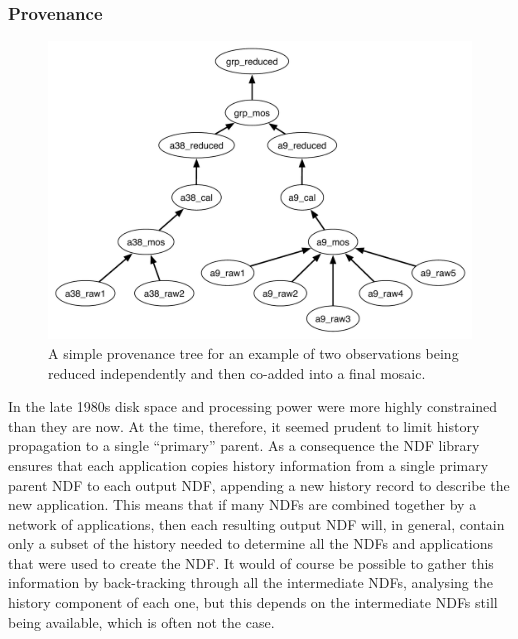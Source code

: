 \documentclass[final,authoryear,5p,times,twocolumn]{elsarticle}
\begin{document}
\subsubsection{Provenance}
\label{sec:provenance}

\begin{figure}
\includegraphics[width=\columnwidth]{provenance}
\caption{A simple provenance tree for an example of two observations
  being reduced independently and then co-added into a final
  mosaic.}
\label{fig:prov}
\end{figure}

In the late 1980s disk space and processing power were more highly
constrained than they are now. At the time, therefore, it
seemed prudent to limit history propagation to a single ``primary''
parent.  As a consequence the NDF library ensures that each application
copies history information from a single primary parent NDF to each
output NDF, appending a new history record to describe the new
application. This means that if many NDFs are combined together by a
network of applications, then each resulting output NDF will, in
general, contain only a subset of the history needed to determine all
the NDFs and applications that were used to create the NDF. It would
of course be possible to gather this information by back-tracking
through all the intermediate NDFs, analysing the history component of
each one, but this depends on the intermediate NDFs still being
available, which is often not the case.
\end{document}
